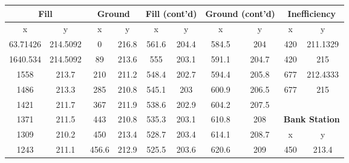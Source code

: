 \begin{center}
\begin{tabular}{|cccc||cccc||cc|} 
    \hline
    \multicolumn{2}{|c}{\textbf{Fill}} & \multicolumn{2}{c||}{\textbf{Ground}} & \multicolumn{2}{c}{\textbf{Fill (cont'd)}} & \multicolumn{2}{c||}{\textbf{Ground (cont'd)}} & \multicolumn{2}{c|}{\textbf{Inefficiency}}    \\ 
    \hline
    x        & y                       & x     & y                            & x     & y                         & x     & y                            & x        & y                                  \\
    63.71426 & 214.5092                & 0     & 216.8                        & 561.6 & 204.4                     & 584.5 & 204                          & 420      & 211.1329                           \\
    1640.534 & 214.5092                & 89    & 213.6                        & 555   & 203.1                     & 591.1 & 204.7                        & 420      & 215                                \\
    1558     & 213.7                   & 210   & 211.2                        & 548.4 & 202.7                     & 594.4 & 205.8                        & 677      & 212.4333                           \\
    1486     & 213.3                   & 285   & 210.8                        & 545.1 & 203                       & 600.9 & 206.5                        & 677      & 215                                \\
    1421     & 211.7                   & 367   & 211.9                        & 538.6 & 202.9                     & 604.2 & 207.5                        &          &                                    \\
    1371     & 211.5                   & 443   & 210.8                        & 535.3 & 203.1                     & 610.8 & 208                          & \multicolumn{2}{c|}{\textbf{Bank Station}}    \\ 
    \cline{9-10}
    1309     & 210.2                   & 450   & 213.4                        & 528.7 & 203.4                     & 614.1 & 208.7                        & x        & y                                  \\
    1243     & 211.1                   & 456.6 & 212.9                        & 525.5 & 203.6                     & 620.6 & 209                          & 450      & 213.4                              \\

\end{tabular}
\end{center}
